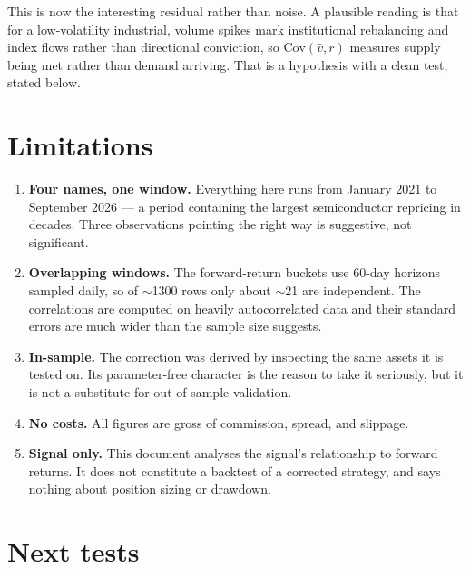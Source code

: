 \documentclass[11pt,a4paper]{article}
\newcommand{\vhat}{\hat{v}}
\begin{document}
This is now the interesting residual rather than noise. A plausible reading is that for a
low-volatility industrial, volume spikes mark institutional rebalancing and index flows
rather than directional conviction, so $\mathrm{Cov}(\vhat, r)$ measures supply being met
rather than demand arriving. That is a hypothesis with a clean test, stated below.

\section{Limitations}

\begin{enumerate}[leftmargin=1.4em]
\item \textbf{Four names, one window.} Everything here runs from January 2021 to September
2026 --- a period containing the largest semiconductor repricing in decades. Three
observations pointing the right way is suggestive, not significant.
\item \textbf{Overlapping windows.} The forward-return buckets use 60-day horizons sampled
daily, so of $\sim$1300 rows only about $\sim$21 are independent. The correlations are
computed on heavily autocorrelated data and their standard errors are much wider than the
sample size suggests.
\item \textbf{In-sample.} The correction was derived by inspecting the same assets it is
tested on. Its parameter-free character is the reason to take it seriously, but it is not a
substitute for out-of-sample validation.
\item \textbf{No costs.} All figures are gross of commission, spread, and slippage.
\item \textbf{Signal only.} This document analyses the signal's relationship to forward
returns. It does not constitute a backtest of a corrected strategy, and says nothing about
position sizing or drawdown.
\end{enumerate}

\section{Next tests}
\end{document}
